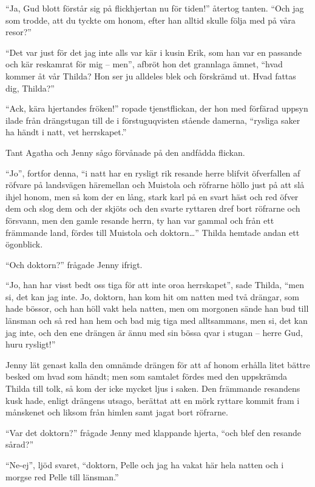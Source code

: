 ``Ja, Gud blott förstår sig på flickhjertan nu för tiden!'' återtog
tanten. ``Och jag som trodde, att du tyckte om honom, efter han alltid
skulle följa med på våra resor?''

``Det var just för det jag inte alls var kär i kusin Erik, som han var
en passande och kär reskamrat för mig -- men'', afbröt hon det grannlaga
ämnet, ``hvad kommer åt vår Thilda? Hon ser ju alldeles blek och
förskrämd ut. Hvad fattas dig, Thilda?''

``Ack, kära hjertandes fröken!'' ropade tjenstflickan, der hon med
förfärad uppsyn ilade från drängstugan till de i förstuguqvisten stående
damerna, ``rysliga saker ha händt i natt, vet herrskapet.''

Tant Agatha och Jenny sågo förvånade på den andfådda flickan.

``Jo'', fortfor denna, ``i natt har en rysligt rik resande herre blifvit
öfverfallen af röfvare på landsvägen häremellan och Muistola och
röfrarne höllo just på att slå ihjel honom, men så kom der en lång,
stark karl på en svart häst och red öfver dem och slog dem och der
skjöts och den svarte ryttaren dref bort röfrarne och försvann, men den
gamle resande herrn, ty han var gammal och från ett främmande land,
fördes till Muistola och doktorn\ldots{}'' Thilda hemtade andan ett
ögonblick.

``Och doktorn?'' frågade Jenny ifrigt.

``Jo, han har visst bedt oss tiga för att inte oroa herrskapet'', sade
Thilda, ``men si, det kan jag inte. Jo, doktorn, han kom hit om natten
med två drängar, som hade bössor, och han höll vakt hela natten, men om
morgonen sände han bud till länsman och så red han hem och bad mig tiga
med alltsammans, men si, det kan jag inte, och den ene drängen är ännu
med sin bössa qvar i stugan -- herre Gud, huru rysligt!''

Jenny lät genast kalla den omnämde drängen för att af honom erhålla
litet bättre besked om hvad som händt; men som samtalet fördes med den
uppskrämda Thilda till tolk, så kom der icke mycket ljus i saken. Den
främmande resandens kusk hade, enligt drängens utsago, berättat att en
mörk ryttare kommit fram i månskenet och liksom från himlen samt jagat
bort röfrarne.

``Var det doktorn?'' frågade Jenny med klappande hjerta, ``och blef den
resande sårad?''

``Ne-ej'', ljöd svaret, ``doktorn, Pelle och jag ha vakat här hela
natten och i morgse red Pelle till länsman.''

